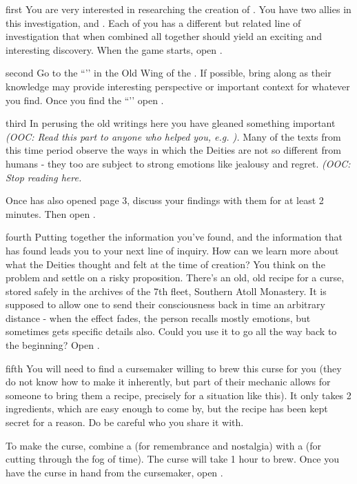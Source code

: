 \documentclass[greennotebook]{GL2020} %
\begin{document}
\startnotebook{\nCreationOne{}}

\begin{page}{first}
You are very interested in researching the creation of \pEarth{}. You have two allies in this investigation, \cHeadScientist{\full} and \cScholarship{\full}. Each of you has a different but related line of investigation that when combined all together should yield an exciting and interesting discovery. When the game starts, open .
\end{page}

\begin{page}{second}
Go to the ``\sOldPhilosophyOne{}’’ in the Old Wing of the \pSc{}. If possible, bring \cPrincipal{} along as their knowledge may provide interesting perspective or important context for whatever you find. Once you find the ``\sOldPhilosophyOne{}’’ open .
\end{page}

\begin{page}{third}
In perusing the old writings here you have gleaned something important \emph{(OOC: Read this part to anyone who helped you, e.g. \cPrincipal{}).} Many of the texts from this time period observe the ways in which the Deities are not so different from humans - they too are subject to strong emotions like jealousy and regret. \emph{(OOC: Stop reading here.}

Once \textbf{\cScholarship{}} has also opened page 3, discuss your findings with them for at least 2 minutes. Then open .
\end{page}

\begin{page}{fourth}
Putting together the information you’ve found, and the information that \cScholarship{} has found leads you to your next line of inquiry. How can we learn more about what the Deities thought and felt at the time of creation? You think on the problem and settle on a risky proposition. There’s an old, old recipe for a curse, stored safely in the archives of the 7th fleet, Southern Atoll Monastery. It is supposed to allow one to send their consciousness back in time an arbitrary distance - when the effect fades, the person recalls mostly emotions, but sometimes gets specific details also. Could you use it to go all the way back to the beginning? Open .
\end{page}

\begin{page}{fifth}
You will need to find a cursemaker willing to brew this curse for you (they do not know how to make it inherently, but part of their mechanic allows for someone to bring them a recipe, precisely for a situation like this). It only takes 2 ingredients, which are easy enough to come by, but the recipe has been kept secret for a reason. Do be careful who you share it with.

To make the curse, combine a \iHollyhock{} (for remembrance and nostalgia) with a \iObsidian{} (for cutting through the fog of time). The curse will take 1 hour to brew. Once you have the curse in hand from the cursemaker, open .
\end{page}
\end{document}
